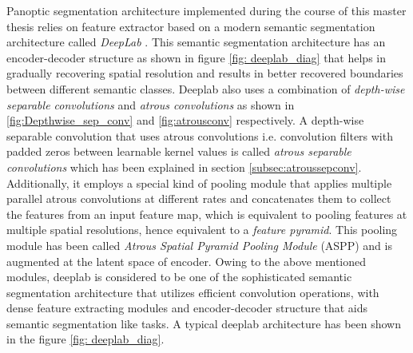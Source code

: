 Panoptic segmentation architecture implemented during the course of this master thesis relies on feature extractor based on a modern semantic segmentation architecture called \textit{DeepLab} \cite{Deeplabv3+:journals/corr/abs-1802-02611}. This semantic segmentation architecture has an encoder-decoder structure as shown in figure \ref{fig: deeplab_diag} that helps in gradually recovering spatial resolution and results in better recovered boundaries between different semantic classes. Deeplab also uses a combination of \textit{depth-wise separable convolutions } and \textit{atrous convolutions} as shown in \ref{fig:Depthwise_sep_conv} and \ref{fig:atrousconv} respectively. A depth-wise separable convolution that uses atrous convolutions i.e. convolution filters with padded zeros between learnable kernel values is called \textit{atrous separable convolutions} which has been explained in section \ref{subsec:atroussepconv}. Additionally, it employs a special kind of pooling module that applies multiple parallel atrous convolutions at different rates and concatenates them to collect the features from an input feature map, which is equivalent to pooling features at multiple spatial resolutions, hence equivalent to a \textit{feature pyramid}. This pooling module has been called \textit{Atrous Spatial Pyramid Pooling Module} (ASPP) and is augmented at the latent space of encoder. Owing to the above mentioned modules, deeplab is considered to be one of the sophisticated semantic segmentation architecture that utilizes efficient convolution operations, with dense feature extracting modules and encoder-decoder structure that aids semantic segmentation like tasks. A typical deeplab architecture has been shown in the figure \ref{fig: deeplab_diag}. 



